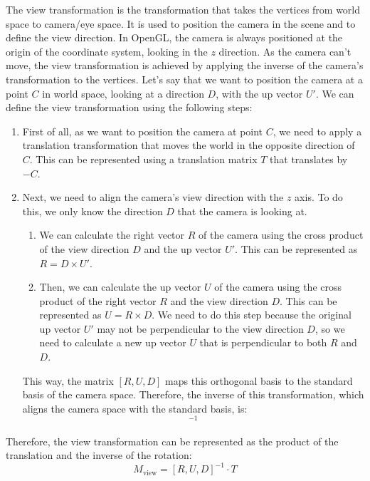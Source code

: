 The view transformation is the transformation that takes the vertices from world space to camera/eye space. It is used to position the camera in the scene and to define the view direction. In OpenGL, the camera is always positioned at the origin of the coordinate system, looking in the $z$ direction. As the camera can't move, the view transformation is achieved by applying the inverse of the camera's transformation to the vertices.
Let's say that we want to position the camera at a point $C$ in world space, looking at a direction $D$, with the up vector $U'$. We can define the view transformation using the following steps:
\begin{enumerate}
    \item First of all, as we want to position the camera at point $C$, we need to apply a translation transformation that moves the world in the opposite direction of $C$. This can be represented using a translation matrix $T$ that translates by $-C$.
    \item Next, we need to align the camera's view direction with the $z$ axis. To do this, we only know the direction $D$ that the camera is looking at.
    \begin{enumerate}
        \item We can calculate the right vector $R$ of the camera using the cross product of the view direction $D$ and the up vector $U'$. This can be represented as $R = D \times U'$.
        \item Then, we can calculate the up vector $U$ of the camera using the cross product of the right vector $R$ and the view direction $D$. This can be represented as $U = R \times D$. We need to do this step because the original up vector $U'$ may not be perpendicular to the view direction $D$, so we need to calculate a new up vector $U$ that is perpendicular to both $R$ and $D$.
    \end{enumerate}

    This way, the matrix $[R, U, D]$ maps this orthogonal basis to the standard basis of the camera space. Therefore, the inverse of this transformation, which aligns the camera space with the standard basis, is:
    \begin{equation*}
        [R, U, D]^{-1}
    \end{equation*}
\end{enumerate}

Therefore, the view transformation can be represented as the product of the translation and the inverse of the rotation:
\begin{equation*}
    M_{\text{view}} = [R, U, D]^{-1} \cdot T
\end{equation*}

